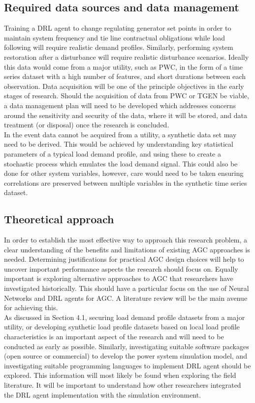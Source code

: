 \documentclass[12pt, a4paper]{article}
\begin{document}
\subsection{Required data sources and data management}
Training a DRL agent to change regulating generator set points in order to maintain system frequency and tie line contractual obligations while load following will require realistic demand profiles. Similarly, performing system restoration after a disturbance will require realistic disturbance scenarios. Ideally this data would come from a major utility, such as PWC, in the form of a time series dataset with a high number of features, and short durations between each observation. Data acquisition will be one of the principle objectives in the early stages of research. Should the acquisition of data from PWC or TGEN be viable, a data management plan will need to be developed which addresses concerns around the sensitivity and security of the data, where it will be stored, and data treatment (or disposal) once the research is concluded.\\

In the event data cannot be acquired from a utility, a synthetic data set may need to be derived. This would be achieved by understanding key statistical parameters of a typical load demand profile, and using these to create a stochastic process which emulates the load demand signal. This could also be done for other system variables, however, care would need to be taken ensuring correlations are preserved between multiple variables in the synthetic time series dataset.

\subsection{Theoretical approach}
In order to establish the most effective way to approach this research problem, a clear understanding of the benefits and limitations of existing AGC approaches is needed. Determining justifications for practical AGC design choices will help to uncover important performance aspects the research should focus on. Equally important is exploring alternative approaches to AGC that researchers have investigated historically. This should have a particular focus on the use of Neural Networks and DRL agents for AGC. A literature review will be the main avenue for achieving this.\\

As discussed in Section 4.1, securing load demand profile datasets from a major utility, or developing synthetic load profile datasets based on local load profile characteristics is an important aspect of the research and will need to be conducted as early as possible. Similarly, investigating suitable software packages (open source or commercial) to develop the power system simulation model, and investigating suitable programming languages to implement DRL agent should be explored. This information will most likely be found when exploring the field literature. It will be important to understand how other researchers integrated the DRL agent implementation with the simulation environment.\\
\end{document}
